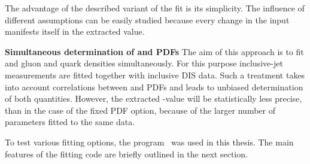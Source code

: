 The advantage of the described variant of the fit is its simplicity. The influence of different assumptions can be easily studied because every change in the input manifests itself in the extracted \asz value. 

{\flushleft \textbf{Simultaneous determination of \asz and PDFs}}\newline
The aim of this approach is to fit \asz and gluon and quark densities simultaneously. For this purpose inclusive-jet measurements are fitted together with inclusive DIS data. Such a treatment takes into account correlations between \as and PDFs and leads to unbiased determination of both quantities. However, the extracted \asz-value will be statistically less precise, than in the case of the fixed PDF option, because of the larger number of parameters fitted to the same data.

To test various fitting options, the \herafitter program~\cite{herafitter} was used in this thesis. The main features of the fitting code are briefly outlined in the next section. 
